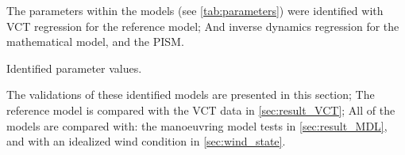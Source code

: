 The parameters within the models (see \autoref{tab:parameters}) were identified with VCT regression for the reference model; And inverse dynamics regression for the mathematical model, and the PISM. 
\begin{table}[h]
    \centering
    \caption{Identified parameter values.}
    \label{tab:parameters}
\end{table}

The validations of these identified models are presented in this section; The reference model is compared with the VCT data in \autoref{sec:result_VCT}; All of the models are compared with: the manoeuvring model tests in \autoref{sec:result_MDL}, and with an idealized wind condition in \autoref{sec:wind_state}.